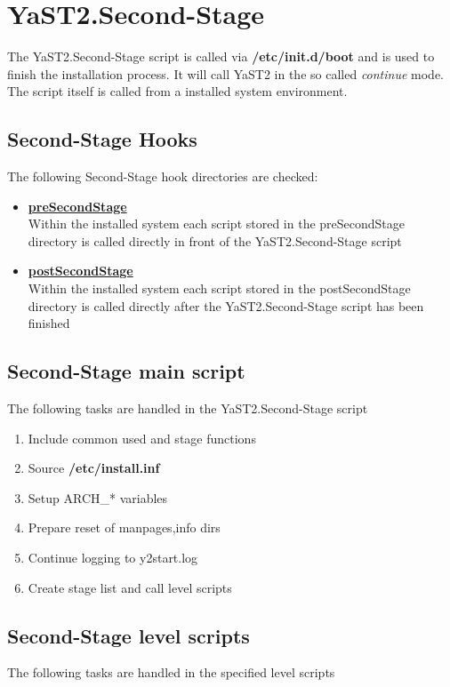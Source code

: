 \chapter{YaST2.Second-Stage}

The YaST2.Second-Stage script is called via \textbf{/etc/init.d/boot}
and is used to finish the installation process. It will call YaST2
in the so called \textit{continue} mode. The script itself is called
from a installed system environment.

\section{Second-Stage Hooks}
The following Second-Stage hook directories are checked:

\begin{itemize}
\item \textbf{\underline{preSecondStage}}\\
	Within the installed system each script stored in the preSecondStage
	directory is called directly in front of the YaST2.Second-Stage script
\item \textbf{\underline{postSecondStage}}\\
	Within the installed system each script stored in the postSecondStage
	directory is called directly after the YaST2.Second-Stage script has
	been finished
\end{itemize}

\section{Second-Stage main script}
The following tasks are handled in the YaST2.Second-Stage script

\begin{enumerate}
\item Include common used and stage functions
\item Source \textbf{/etc/install.inf}
\item Setup ARCH\_* variables
\item Prepare reset of manpages,info dirs
\item Continue logging to y2start.log
\item Create stage list and call level scripts
\end{enumerate}

\newpage

\section{Second-Stage level scripts}
The following tasks are handled in the specified level scripts

